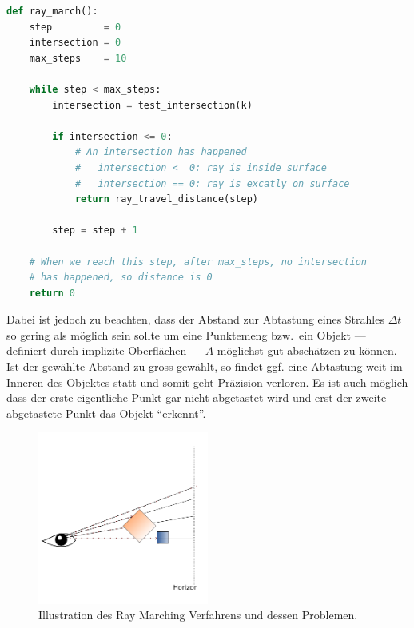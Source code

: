 \begin{lstlisting}[language=Python,caption={Eine abstrakte Umsetzung des Ray
        Marchings\protect\footnotemark.},label={fig:ray_marching},captionpos=b,emph={ray_march}]
def ray_march():
    step         = 0
    intersection = 0
    max_steps    = 10

    while step < max_steps:
        intersection = test_intersection(k)

        if intersection <= 0:
            # An intersection has happened
            #   intersection <  0: ray is inside surface
            #   intersection == 0: ray is excatly on surface
            return ray_travel_distance(step)

        step = step + 1

    # When we reach this step, after max_steps, no intersection
    # has happened, so distance is 0
    return 0
\end{lstlisting}

Dabei ist jedoch zu beachten, dass der Abstand zur Abtastung eines Strahles
$\Delta t$ so gering als möglich sein sollte um eine Punktemeng bzw.\ ein
Objekt --- definiert durch implizite Oberflächen --- $A$ möglichst gut
abschätzen zu können. Ist der gewählte Abstand zu gross gewählt, so findet ggf.
eine Abtastung weit im Inneren des Objektes statt und somit geht Präzision
verloren.  Es ist auch möglich dass der erste eigentliche Punkt gar nicht
abgetastet wird und erst der zweite abgetastete Punkt das Objekt ``erkennt''.

\begin{figure}[H]
    \caption{Illustration des Ray Marching Verfahrens und dessen
    Problemen.\protect\footnotemark}\label{fig:ray_marching_problems}
    \centering
    \includegraphics[width=0.5\textwidth]{img/ray_marching_problems.png}
\end{figure}

